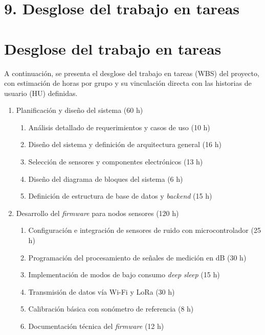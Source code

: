 \documentclass[
11pt, %
]{charter}
\begin{document}
\section{9. Desglose del trabajo en tareas}
\label{sec:wbs}

\section{Desglose del trabajo en tareas}

A continuación, se presenta el desglose del trabajo en tareas (WBS) del proyecto, con estimación de horas por grupo y su vinculación directa con las historias de usuario (HU) definidas.

\begin{enumerate}
    \item Planificación y diseño del sistema (60 h)
    \begin{enumerate}
        \item Análisis detallado de requerimientos y casos de uso (10 h) 
        \item Diseño del sistema y definición de arquitectura general (16 h) 
        \item Selección de sensores y componentes electrónicos (13 h) 
        \item Diseño del diagrama de bloques del sistema (6 h) 
        \item Definición de estructura de base de datos y \textit{backend} (15 h) 
    \end{enumerate}

    \item Desarrollo del \textit{firmware} para nodos sensores (120 h)
    \begin{enumerate}
        \item Configuración e integración de sensores de ruido con microcontrolador (25 h) 
        \item Programación del procesamiento de señales de medición en dB (30 h)
        \item Implementación de modos de bajo consumo  \textit{deep sleep} (15 h) 
        \item Transmisión de datos vía Wi-Fi y LoRa (30 h) 
        \item Calibración básica con sonómetro de referencia (8 h) 
        \item Documentación técnica del \textit{firmware} (12 h) 
    \end{enumerate}


\end{enumerate}
\end{document}

